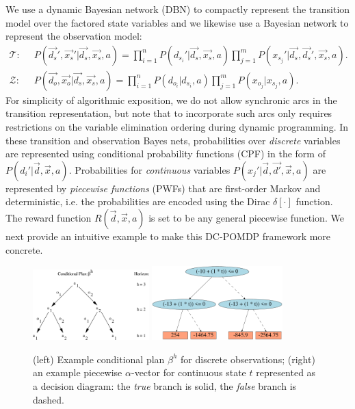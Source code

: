 \documentclass{article} %
\begin{document}
We use a dynamic Bayesian network (DBN) to compactly represent the transition model over the factored state variables and we likewise use a Bayesian network to represent the observation model:
{\footnotesize
\begin{align*}
\mathcal{T}: \;\; &
P(\vec{d_s}',\vec{x_s}'|\vec{d_s},\vec{x_s},a) = 
\prod_{i=1}^n P(d_{s_i}'|\vec{d_s},\vec{x_s},a) \prod_{j=1}^m P(x_{s_j}'|\vec{d_s},\vec{d_s}',\vec{x_s},a). \nonumber \\
\mathcal{Z}: \;\; & 
P(\vec{d_o},\vec{x_o}|\vec{d_s},\vec{x_s},a) = 
\prod_{i=1}^n P(d_{o_i}|d_{s_i},a) \prod_{j=1}^m P(x_{o_j}|x_{s_j},a). \nonumber 
\end{align*}}
For simplicity of algorithmic exposition, we do not allow synchronic
arcs in the transition representation, but note that to incorporate
such arcs only requires restrictions on the variable elimination
ordering during dynamic programming.  In these transition and
observation Bayes nets, 
probabilities over 
\emph{discrete} variables are represented using conditional probability
functions (CPF) in the form of
$P(d_i'|\vec{d},\vec{x},a)$. Probabilities for \emph{continuous} variables
$P(x_j'|\vec{d},\vec{d'},\vec{x},a)$ are represented by
\emph{piecewise functions} (PWFs) that are first-order Markov
and deterministic, i.e. the probabilities are encoded using the Dirac
$\delta[\cdot]$ function. The reward function $R(\vec{d},\vec{x},a)$
is set to be any general piecewise function.  We next provide an intuitive
example to make this DC-POMDP framework more concrete.
\begin{figure}[t!]
\begin{center}
\includegraphics[width=0.4\textwidth]{pics/cond_plan2.pdf}
\hspace{5mm}
\includegraphics[width=0.45\textwidth]{pics/b1-4.pdf}
\end{center}
\vspace{-2mm}
\caption{\footnotesize (left) Example conditional plan $\beta^h$ for discrete observations; (right) an example piecewise $\alpha$-vector for continuous state $t$ represented
as a 
decision diagram: 
the \emph{true} branch is solid, the \emph{false}
branch is dashed.}
\label{fig:cond_plan}
\vspace{-1mm}
\end{figure}
\end{document}
